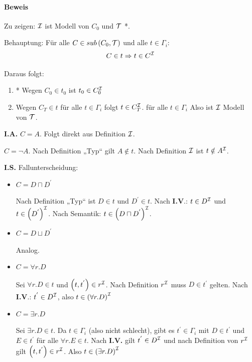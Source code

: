 \paragraph{Beweis}

Zu zeigen: $\mathcal{I}$ ist Modell von $C_{0}$ und $\mathcal{T}$ *.

Behauptung: Für alle $C \in sub\left( C_{0},\mathcal{T} \right)$ und alle
$t \in \Gamma_{i}$:
$$C \in t \Rightarrow t \in C^{\mathcal{I}}$$

Daraus folgt:

\begin{enumerate}
\def\labelenumi{\arabic{enumi}.}
\item
  * Wegen $C_{0} \in t_{0}$ ist $t_{0} \in C_{0}^{\mathcal{I}}$
\item
  Wegen $C_{T} \in t$ für alle $t \in \Gamma_{i}$ folgt
  $t \in C_{T}^{\mathcal{I}}$. für alle $t \in \Gamma_{i}$ Also ist $\mathcal{I}$ Modell von $\mathcal{T}$.
\end{enumerate}

\textbf{I.A.} $C = A$. Folgt direkt aus Definition $\mathcal{I}$.

$C = \neg A$. Nach Definition „Typ`` gilt $A \notin t$. Nach
Definition $\mathcal{I}$ ist $t \notin A^{\mathcal{I}}$.

\textbf{I.S.} Fallunterscheidung:

\begin{itemize}
\item
  $C = D \sqcap D^{'}$

Nach Definition „Typ`` ist $D \in t$ und $D^{'} \in t$. Nach
\textbf{I.V}.: $t \in D^{\mathcal{I}}$ und $t \in \left( D^{'} \right)^{\mathcal{I}}$.
Nach Semantik: $t \in \left( D \sqcap D^{'} \right)^{\mathcal{I}}$.

\item
  $C = D \sqcup D^{'}$

Analog.

\item
  $C = \forall r.D$

Sei $\forall r.D \in t$ und $\left( t,t^{'} \right) \in r^{\mathcal{I}}$. Nach
Definition $r^{\mathcal{I}}$ muss $D \in t^{'}$ gelten. Nach \textbf{I.V}.:
$t^{'} \in D^{\mathcal{I}}$, also $t \in \left( \forall r.D \right)^{\mathcal{I}}$

\item
  $C = \exists r.D$

Sei $\exists r.D \in t$. Da $t \in \Gamma_{i}$ (also nicht
schlecht), gibt es $t^{'} \in \Gamma_{i}$ mit $D \in t^{'}$ und
$E \in t^{'}$ für alle $\forall r.E \in t$. Nach \textbf{I.V.} gilt
$t^{'} \in D^{\mathcal{I}}$ und nach Definition von $r^{\mathcal{I}}$ gilt
$\left( t,t^{'} \right) \in r^{\mathcal{I}}$. Also
$t \in \left( \exists r.D \right)^{\mathcal{I}}$
\end{itemize}

